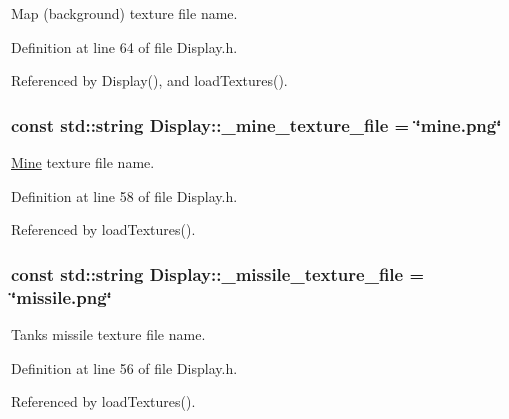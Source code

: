 Map (background) texture file name. 



Definition at line 64 of file Display.\-h.



Referenced by Display(), and load\-Textures().

\hypertarget{classDisplay_a9b6a965f2d1ca97d9c243d4bbd941994}{
\subsubsection[{\-\_\-mine\-\_\-texture\-\_\-file}]{\setlength{\rightskip}{0pt plus 5cm}const std\-::string Display\-::\-\_\-mine\-\_\-texture\-\_\-file = \char`\"{}mine.\-png\char`\"{}\hspace{0.3cm}{\ttfamily [private]}}}\label{classDisplay_a9b6a965f2d1ca97d9c243d4bbd941994}


\hyperlink{classMine}{Mine} texture file name. 



Definition at line 58 of file Display.\-h.



Referenced by load\-Textures().

\hypertarget{classDisplay_a11a966967d1bfa745d910f25da35b6fb}{
\subsubsection[{\-\_\-missile\-\_\-texture\-\_\-file}]{\setlength{\rightskip}{0pt plus 5cm}const std\-::string Display\-::\-\_\-missile\-\_\-texture\-\_\-file = \char`\"{}missile.\-png\char`\"{}\hspace{0.3cm}{\ttfamily [private]}}}\label{classDisplay_a11a966967d1bfa745d910f25da35b6fb}


Tanks missile texture file name. 



Definition at line 56 of file Display.\-h.



Referenced by load\-Textures().

